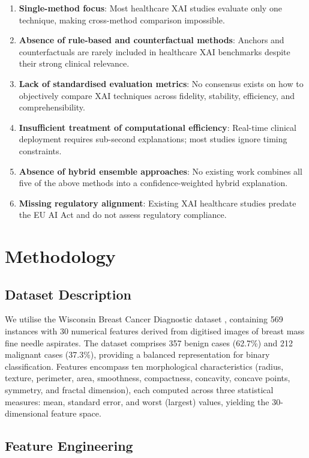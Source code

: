 \documentclass[journal]{IEEEtran}
\newcommand{\citep}[1]{\cite{#1}}
\begin{document}
\begin{enumerate}
\item \textbf{Single-method focus}: Most healthcare XAI studies evaluate only one technique, making cross-method comparison impossible.
\item \textbf{Absence of rule-based and counterfactual methods}: Anchors and counterfactuals are rarely included in healthcare XAI benchmarks despite their strong clinical relevance.
\item \textbf{Lack of standardised evaluation metrics}: No consensus exists on how to objectively compare XAI techniques across fidelity, stability, efficiency, and comprehensibility.
\item \textbf{Insufficient treatment of computational efficiency}: Real-time clinical deployment requires sub-second explanations; most studies ignore timing constraints.
\item \textbf{Absence of hybrid ensemble approaches}: No existing work combines all five of the above methods into a confidence-weighted hybrid explanation.
\item \textbf{Missing regulatory alignment}: Existing XAI healthcare studies predate the EU AI Act and do not assess regulatory compliance.
\end{enumerate}

\section{Methodology}

\subsection{Dataset Description}

We utilise the Wisconsin Breast Cancer Diagnostic dataset \citep{street1993nuclear}, containing 569 instances with 30 numerical features derived from digitised images of breast mass fine needle aspirates. The dataset comprises 357 benign cases (62.7\%) and 212 malignant cases (37.3\%), providing a balanced representation for binary classification. Features encompass ten morphological characteristics (radius, texture, perimeter, area, smoothness, compactness, concavity, concave points, symmetry, and fractal dimension), each computed across three statistical measures: mean, standard error, and worst (largest) values, yielding the 30-dimensional feature space.

\subsection{Feature Engineering}
\end{document}
